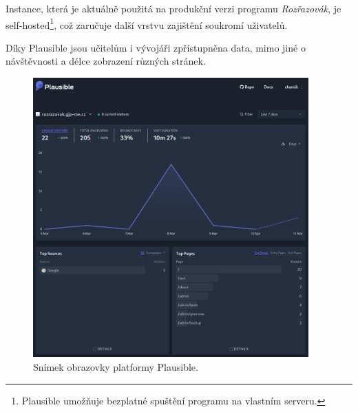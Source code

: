 Instance, která je aktuálně použitá na produkční verzi programu \emph{Rozřazovák}, je self-hosted\footnote{Plausible umožňuje bezplatné spuštění programu na vlastním serveru.}, což zaručuje další vrstvu zajištění soukromí uživatelů.

Díky Plausible jsou učitelům i vývojáři zpřístupněna data, mimo jiné o návštěvnosti  a délce zobrazení různých stránek.

\begin{figure}[H]
    \centering
    \includegraphics[width=400px]{images/02technologie/plausible.png}
    \caption{Snímek obrazovky platformy Plausible.}
\end{figure}
